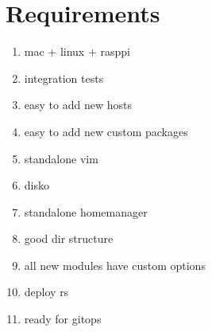 \documentclass[openany, 12pt]{book}
\begin{document}
\chapter{Requirements}
\begin{enumerate}[label = {(\arabic*)}]
	\item mac + linux + rasppi
	\item integration tests
	\item easy to add new hosts
	\item easy to add new custom packages
	\item standalone vim
	\item disko
	\item standalone homemanager
	\item good dir structure
	\item all new modules have custom options
	\item deploy rs
	\item ready for gitops
\end{enumerate}

\end{document}
